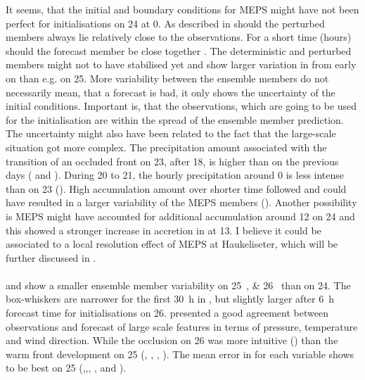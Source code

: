 It seems, that the initial and boundary conditions for MEPS might have not been perfect for initialisations on \SI{24}{\dec} at \SI{0}{\UTC}. As described in  should the perturbed members always lie relatively close to the observations. For a short time (hours) should the forecast member be close together \citep{kalnay_atmospheric_2003}. 
The deterministic and perturbed members might not to have stabilised yet and show larger variation in  from early on than e.g. on \SI{25}{\dec}. More variability between the ensemble members do not necessarily mean, that a forecast is bad, it only shows the uncertainty of the initial conditions. Important is, that the observations, which are going to be used for the initialisation are within the spread of the ensemble member prediction.
\\
The uncertainty might also have been related to the fact that the large-scale situation got more complex. The precipitation amount associated with the transition of an occluded front on \SI{23}{\dec}, after \SI{18}{\UTC}, is higher than on the previous days ( and ). During \num{20} to \SI{21}{\dec}, the hourly precipitation around \SI{0}{\UTC} is less intense than on \SI{23}{\dec} (). High accumulation amount over shorter time followed and could have resulted in a larger variability of the MEPS members (). Another possibility is MEPS might have accounted for additional accumulation around \SI{12}{\UTC} on \SI{24}{\dec} and this showed a stronger increase in accretion in  at \SI{13}{\UTC}. I believe it could be associated to a local resolution effect of MEPS at Haukeliseter, which will be further discussed in . 
\\
\\
 and  show a smaller ensemble member variability on \SIlist{25;26}{\dec} than on \SI{24}{\dec}. The box-whiskers are narrower for the first \SI{30}{\hour} in , but slightly larger after \SI{6}{\hour} forecast time for initialisations on \SI{26}{\dec}.  presented a good agreement between observations and forecast of large scale features in terms of pressure, temperature and wind direction. While the occlusion on \SI{26}{\dec} was more intuitive () than the warm front development on \SI{25}{\dec} (, , , ). The mean error in  for each variable shows to be best on \SI{25}{\dec} (,,, , and ).
